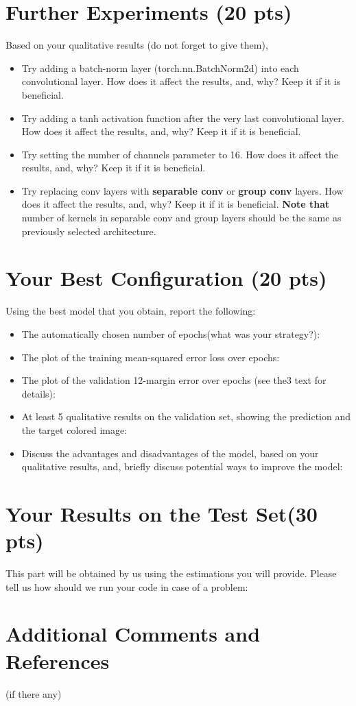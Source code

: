 \documentclass[12pt]{article}
\begin{document}
\section{Further Experiments (20 pts)}
    Based on your qualitative results (do not forget to give them),
    \begin{itemize}
        \item Try adding a batch-norm layer (torch.nn.BatchNorm2d) into each convolutional layer. How does it affect the results, and, why? Keep it if it is beneficial. 
        \item Try adding a tanh activation function after the very last convolutional layer. How does it affect the results, and, why? Keep it if it is beneficial. 
        
        \item Try setting the number of channels parameter to 16. How does it affect the results, and, why? Keep it if it is beneficial. 
        \item Try replacing conv layers with \textbf{separable conv} or \textbf{group conv} layers. How does it affect the results, and, why? Keep it if it is beneficial. \textbf{Note that} number of kernels in separable conv and group layers should be the same as previously selected architecture. 
      
    \end{itemize}


\section{Your Best Configuration (20 pts)}
Using the best model that you obtain, report the following:
 
    \begin{itemize}
        \item The automatically chosen number of epochs(what was your strategy?):
        \item The plot of the training mean-squared error loss over epochs:
        \item The  plot  of  the  validation  12-margin  error  over  epochs (see the3 text for details):
        \item At least 5 qualitative results on the validation set, showing the prediction and the target colored image:
        \item Discuss the advantages and disadvantages of the model, based on your qualitative results, and, briefly discuss potential ways to improve the model:
    \end{itemize}
    
\section{Your Results on the Test Set(30 pts)}
This part will be obtained by us using the estimations you will provide. Please tell us how should we run your code in case of a problem:

\section{Additional Comments and References}

    (if there any)
\end{document}
